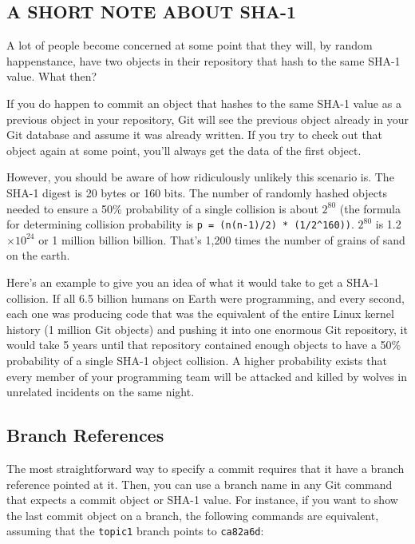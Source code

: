 \documentclass[a4paper]{book}
\newcounter{tab}[chapter]
\newcommand{\e}[1]{$ \times 10^{#1}$}
\begin{document}
\subsection{A SHORT NOTE ABOUT SHA-1}\label{a-short-note-about-sha-1}

A lot of people become concerned at some point that they will, by random happenstance, have two objects in their repository that hash to the same SHA-1 value. What then?

If you do happen to commit an object that hashes to the same SHA-1 value as a previous object in your repository, Git will see the previous object already in your Git database and assume it was already written. If you try to check out that object again at some point, you'll always get the data of the first object.

However, you should be aware of how ridiculously unlikely this scenario is. The SHA-1 digest is 20 bytes or 160 bits. The number of randomly hashed objects needed to ensure a 50\% probability of a single collision is about $2^{80}$ (the formula for determining collision probability is \texttt{p = (n(n-1)/2) * (1/2\^{}160))}. $2^{80}$ is 1.2\e{24} or 1 million billion billion. That's 1,200 times the number of grains of sand on the earth.

Here's an example to give you an idea of what it would take to get a SHA-1 collision. If all 6.5 billion humans on Earth were programming, and every second, each one was producing code that was the equivalent of the entire Linux kernel history (1 million Git objects) and pushing it into one enormous Git repository, it would take 5 years until that repository contained enough objects to have a 50\% probability of a single SHA-1 object collision. A higher probability exists that every member of your programming team will be attacked and killed by wolves in unrelated incidents on the same night.

\subsection{Branch References}\label{branch-references}

The most straightforward way to specify a commit requires that it have a branch reference pointed at it. Then, you can use a branch name in any Git command that expects a commit object or SHA-1 value. For instance, if you want to show the last commit object on a branch, the following commands are equivalent, assuming that the \texttt{topic1} branch points to \texttt{ca82a6d}:
\end{document}
